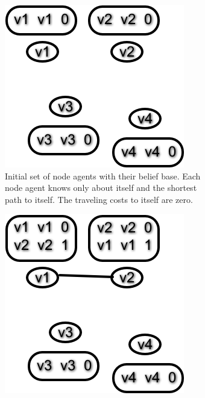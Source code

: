 \begin{figure}
  \centering
  \caption{Executing the Distance-Vector Routing Protocol algorithm as described in \autoref{alg:map_dv} on a small network of four nodes. Each node has a table attached, containing all accessible nodes. The first parameter is the destination node, the second one is the node to pass through and the third parameter shows the overall distance to the destination.       \label{fig:dv}}
    \begin{subfigure}{.45\textwidth}
        \includegraphics[width=\textwidth] {images/dv0.png}
        \caption{Initial set of node agents with their belief base. Each node agent knows only about itself and the shortest path to itself. The traveling costs to itself are zero.}
    \end{subfigure}\quad
    \begin{subfigure}{.45\textwidth}
        \includegraphics[width=\textwidth] {images/dv1.png}

\end{subfigure}
\end{figure}
